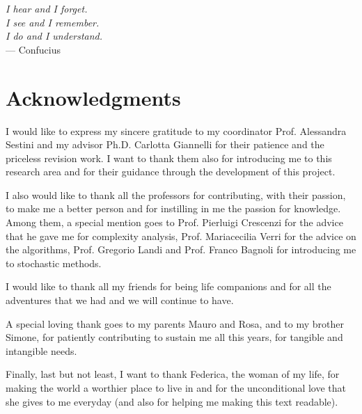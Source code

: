 
\begin{flushright}{
    \slshape
    I hear and I forget.\\
    I see and I remember.\\
    I do and I understand.} \\ \medskip
    --- Confucius
\end{flushright}

\bigskip

\begingroup
\let\clearpage\relax
\let\cleardoublepage\relax
\let\cleardoublepage\relax
\chapter*{Acknowledgments}
I would like to express my sincere gratitude to my coordinator
Prof. Alessandra Sestini and my advisor 
Ph.D. Carlotta Giannelli for their patience and the priceless revision
work. I want to thank them also for introducing me to this research
area and for their guidance through the development of this project.

I also would like to thank all the professors for contributing, with
their passion, to make me a better person and for instilling in me the
passion for knowledge. Among them, a special mention goes to
Prof. Pierluigi Crescenzi for the advice that he gave me for
complexity analysis, Prof. Mariacecilia Verri for the advice on the
algorithms, Prof. Gregorio Landi and Prof. Franco Bagnoli for
introducing me to stochastic methods.

I would like to thank all my friends for being life companions and for
all the adventures that we had and we will continue to have.

A special loving thank goes to my parents Mauro and Rosa, and to my
brother Simone, for patiently 
contributing to sustain me all this years, for tangible and
intangible needs.

Finally, last but not least, I want to thank
Federica, the woman of my life, for making the world a worthier place
to live in 
and for the 
unconditional love that she gives to me everyday (and also for
helping me making this text readable).
\endgroup




